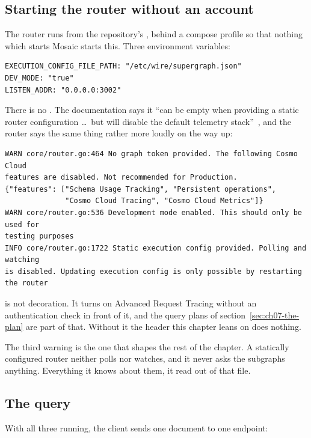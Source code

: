 \subsection*{Starting the router without an account}

%
The router runs from the repository's , behind a
compose profile so that nothing which starts Mosaic starts this. Three
environment variables:

\begin{verbatim}
EXECUTION_CONFIG_FILE_PATH: "/etc/wire/supergraph.json"
DEV_MODE: "true"
LISTEN_ADDR: "0.0.0.0:3002"
\end{verbatim}

There is no . The documentation says it \enquote{can be
empty when providing a static router configuration \dots\ but will disable the
default telemetry stack}~\autocite{cosmo2026routerconfig}, and the router says
the same thing rather more loudly on the way up:

\begin{verbatim}
WARN core/router.go:464 No graph token provided. The following Cosmo Cloud
features are disabled. Not recommended for Production.
{"features": ["Schema Usage Tracking", "Persistent operations",
              "Cosmo Cloud Tracing", "Cosmo Cloud Metrics"]}
WARN core/router.go:536 Development mode enabled. This should only be used for
testing purposes
INFO core/router.go:1722 Static execution config provided. Polling and watching
is disabled. Updating execution config is only possible by restarting the router
\end{verbatim}

 is not decoration. It turns on Advanced Request Tracing without
an authentication check in front of it, and the query plans of
section~\ref{sec:ch07-the-plan} are part of that. Without it the header this
chapter leans on does nothing.

The third warning is the one that shapes the rest of the chapter. A statically
configured router neither polls nor watches, and it never asks the subgraphs
anything. Everything it knows about them, it read out of that file.

\subsection*{The query}

%
With all three running, the client sends one document to one endpoint:

